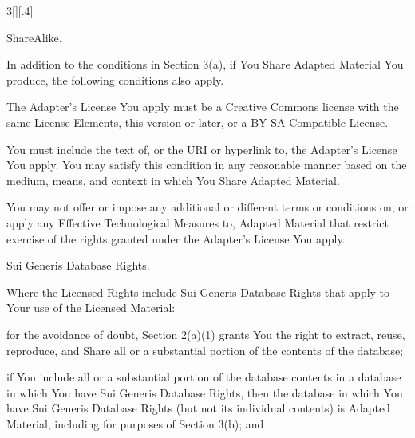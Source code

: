 \documentclass[8pt,cleardoubleempty]{scrbook}
\begin{document}
\begin{multicols}{3}[][.4\paperwidth]
\begin{longenum}
\begin{longenum}
  \item ShareAlike.

     In addition to the conditions in Section 3(a), if You Share
     Adapted Material You produce, the following conditions also apply.

       \begin{longenum}

       \item The Adapter's License You apply must be a Creative Commons
          license with the same License Elements, this version or
          later, or a BY-SA Compatible License.

       \item You must include the text of, or the URI or hyperlink to, the
          Adapter's License You apply. You may satisfy this condition
          in any reasonable manner based on the medium, means, and
          context in which You Share Adapted Material.

       \item You may not offer or impose any additional or different terms
          or conditions on, or apply any Effective Technological
          Measures to, Adapted Material that restrict exercise of the
          rights granted under the Adapter's License You apply.

       \end{longenum}

  \end{longenum}


 \item Sui Generis Database Rights.

 Where the Licensed Rights include Sui Generis Database Rights that
 apply to Your use of the Licensed Material:

  \begin{longenum}

  \item for the avoidance of doubt, Section 2(a)(1) grants You the right
     to extract, reuse, reproduce, and Share all or a substantial
     portion of the contents of the database;

  \item if You include all or a substantial portion of the database
     contents in a database in which You have Sui Generis Database
     Rights, then the database in which You have Sui Generis Database
     Rights (but not its individual contents) is Adapted Material,
     including for purposes of Section 3(b); and


\end{longenum}
\end{longenum}
\end{multicols}
\end{document}
